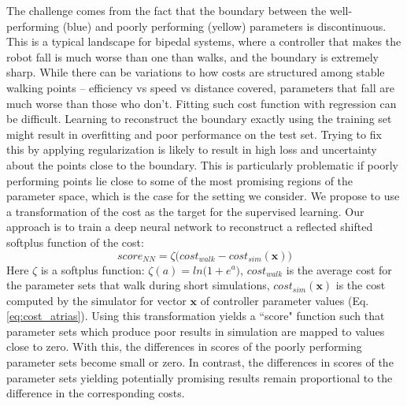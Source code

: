 The challenge comes from the fact that the boundary between the well-performing (blue) and poorly performing (yellow) parameters is discontinuous. This is a typical landscape for bipedal systems, where a controller that makes the robot fall is much worse than one than walks, and the boundary is extremely sharp. While there can be variations to how costs are structured among stable walking points -- efficiency vs speed vs distance covered, parameters that fall are much worse than those who don't. Fitting such cost function with regression can be difficult. Learning to reconstruct the boundary exactly using the training set might result in overfitting and poor performance on the test set. Trying to fix this by applying regularization is likely to result in high loss and uncertainty about the points close to the boundary. This is particularly problematic if poorly performing points lie close to some of the most promising regions of the parameter space, which is the case for the setting we consider. 
We propose to use a transformation of the cost as the target for the supervised learning. Our approach is to train a deep neural network to reconstruct a reflected shifted softplus function of the cost: 
\begin{equation}
\textit{score}_{\textit{NN}} = \zeta \big( cost_{walk} - cost_{sim}(\pmb{x}) \big)
\label{eq:score_asymnn}
\end{equation}
Here $\zeta$ is a softplus function: $\zeta(a) = ln\big( 1 + e^a \big)$, $cost_{walk}$ is the average cost for the parameter sets that walk during short simulations, $cost_{sim}(\pmb{x})$ is the cost computed by the simulator for vector $\pmb{x}$ of controller parameter values (Eq. \ref{eq:cost_atrias}). Using this transformation yields a ``score" function such that parameter sets which produce poor results in simulation are mapped to values close to zero. With this, the differences in scores of the poorly performing parameter sets become small or zero. In contrast, the differences in scores of the parameter sets yielding potentially promising results remain proportional to the difference in the corresponding costs. %

